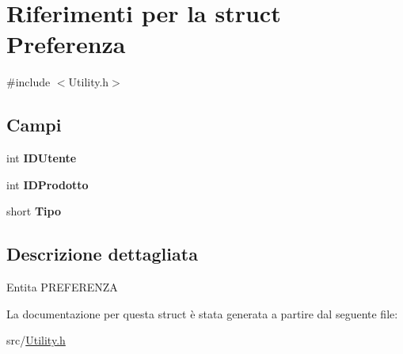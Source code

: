 \hypertarget{struct_preferenza}{}\section{Riferimenti per la struct Preferenza}
\label{struct_preferenza}


{\ttfamily \#include $<$Utility.\+h$>$}

\subsection*{Campi}
\begin{DoxyCompactItemize}
\item 
\mbox{\label{struct_preferenza_a4f6a7e5310f59d4946c8394240b2076a}} 
int {\bfseries I\+D\+Utente}
\item 
\mbox{\label{struct_preferenza_a767f68850ef485ff486fccd451d41ddc}} 
int {\bfseries I\+D\+Prodotto}
\item 
\mbox{\label{struct_preferenza_a391d7661828cf0294fcb9207592dcfa6}} 
short {\bfseries Tipo}
\end{DoxyCompactItemize}


\subsection{Descrizione dettagliata}
Entita\textquotesingle{} P\+R\+E\+F\+E\+R\+E\+N\+ZA 

La documentazione per questa struct è stata generata a partire dal seguente file\+:\begin{DoxyCompactItemize}
\item 
src/\hyperlink{_utility_8h}{Utility.\+h}\end{DoxyCompactItemize}
